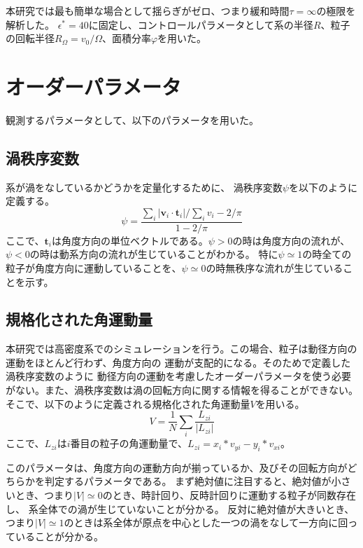 \documentclass[/Users/ikedahajime/GitHub/reserch/master_report/thesis]{subfiles}
\begin{document}
本研究では最も簡単な場合として揺らぎがゼロ、つまり緩和時間$\tau=\infty$の極限を解析した。
$\epsilon^*=40$に固定し、コントロールパラメータとして系の半径$R$、粒子の回転半径$R_\Omega=v_0/\Omega$、面積分率$\varphi$を用いた。


\section{オーダーパラメータ}
観測するパラメータとして、以下のパラメータを用いた。
\subsection{渦秩序変数}\label{subsec:vortes_order_parameter}
系が渦をなしているかどうかを定量化するために、
渦秩序変数$\psi$\cite{wiolandConfinementStabilizesBacterial2013}を以下のように定義する。
\begin{equation}\label{eq:def_psi}
    \psi=\frac{\sum_i \left|\bm{v}_i\cdot \bm{t}_i \right|/\sum_i v_i -2/\pi}{1-2/\pi}
\end{equation}
ここで、$\bm{t}_i$は角度方向の単位ベクトルである。$\psi>0$の時は角度方向の流れが、$\psi<0$の時は動系方向の流れが生じていることがわかる。
特に$\psi\simeq1$の時全ての粒子が角度方向に運動していることを、$\psi\simeq0$の時無秩序な流れが生じていることを示す。


\subsection{規格化された角運動量}
本研究では高密度系でのシミュレーションを行う。この場合、粒子は動径方向の運動をほとんど行わず、角度方向の
運動が支配的になる。そのためで定義した渦秩序変数のように
動径方向の運動を考慮したオーダーパラメータを使う必要がない。また、渦秩序変数は渦の回転方向に関する情報を得ることができない。
そこで、以下のように定義される規格化された角運動量$V$\cite{jiangEmergenceCollectiveDynamical2017,capriniCollectiveEffectsConfined2021}を用いる。
\begin{equation}
    V=\frac{1}{N} \sum_i \frac{L_{zi}}{ |L_{zi}|}
\end{equation}
ここで、$L_{zi}$は$i$番目の粒子の角運動量で、$L_{zi}=x_i*v_{yi}-y_i*v_{xi}$。


このパラメータは、角度方向の運動方向が揃っているか、及びその回転方向がどちらかを判定するパラメータである。
まず絶対値に注目すると、絶対値が小さいとき、つまり$|V|\simeq 0$のとき、時計回り、反時計回りに運動する粒子が同数存在し、
系全体での渦が生じていないことが分かる。
反対に絶対値が大きいとき、つまり$|V|\simeq 1$のときは系全体が原点を中心とした一つの渦をなして一方向に回っていることが分かる。
\end{document}
